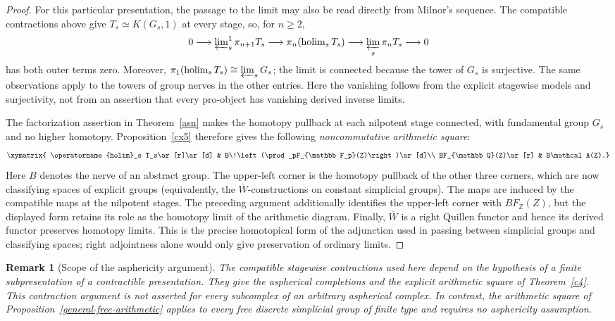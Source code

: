 \documentclass[11pt,a4paper]{article}
\newtheorem{remark}[theorem]{Remark}
\begin{document}
\begin{proof}
For this particular presentation, the passage to the limit may also
be read directly from Milnor's sequence.  The compatible contractions
above give $T_s\simeq K(G_s,1)$ at every stage, so, for $n\geq2$,
\[
 0\longrightarrow\varprojlim\nolimits_s^1\pi_{n+1}T_s
 \longrightarrow\pi_n(\operatorname{holim}_sT_s)
 \longrightarrow\varprojlim_s\pi_nT_s\longrightarrow0
\]
has both outer terms zero.  Moreover,
$\pi_1(\operatorname{holim}_sT_s)\cong\varprojlim_sG_s$;
the limit is connected because the tower of $G_s$ is surjective.
The same observations apply to the towers of group nerves in the
other entries.  Here the vanishing follows from the explicit
stagewise models and surjectivity, not from an assertion that every
pro-object has vanishing derived inverse limits.


The factorization assertion in Theorem~\ref{asn} makes the homotopy
pullback at each nilpotent stage connected, with fundamental group
$G_s$ and no higher homotopy.  Proposition~\ref{cx5} therefore gives the
following \emph{noncommutative arithmetic square}:
\begin{equation}\label{as2}
\xymatrix{
 \operatorname{holim}_s T_s\ar[r]\ar[d] &
 B\!\left(\prod_pF_{\mathbb F_p}(Z)\right)\ar[d]\\
 BF_{\mathbb Q}(Z)\ar[r] & B\mathcal A(Z).}
\end{equation}
Here $B$ denotes the nerve of an abstract group.  The upper-left corner
is the homotopy pullback of the other three corners, which are now
classifying spaces of explicit groups (equivalently, the
$\overline W$-constructions on constant simplicial groups).
The maps are induced by the compatible maps at the nilpotent stages.
The preceding argument additionally identifies the upper-left corner
with $BF_{\mathbb Z}(Z)$, but the displayed form retains its role as
the homotopy limit of the arithmetic diagram.
Finally, $\overline W$ is a right Quillen functor and hence its derived
functor preserves homotopy limits.  This is the precise homotopical
form of the adjunction used in passing between simplicial groups and
classifying spaces; right adjointness alone would only give preservation
of ordinary limits.
\end{proof}

\begin{remark}[Scope of the asphericity argument]
The compatible stagewise contractions used here depend on the
hypothesis of a finite subpresentation of a contractible presentation.
They give the aspherical completions and the explicit arithmetic square
of Theorem~\ref{c4}.  This contraction argument is not asserted for
every subcomplex of an arbitrary aspherical complex.  In contrast,
the arithmetic square of Proposition~\ref{general-free-arithmetic}
applies to every free discrete simplicial group of finite type and
requires no asphericity assumption.
\end{remark}
\end{document}
